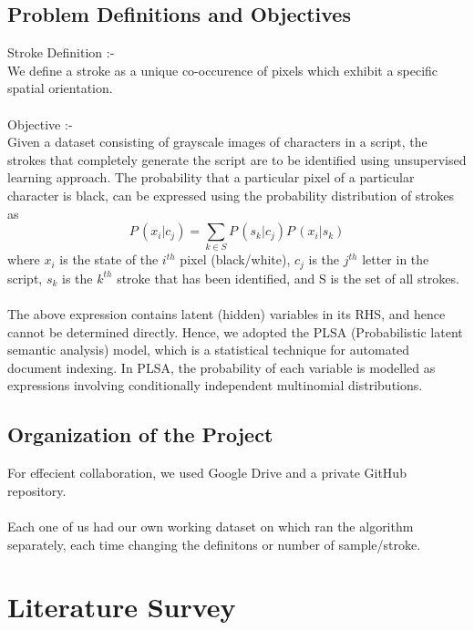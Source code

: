 \documentclass[10pt]{article}
\begin{document}
		\subsection{Problem Definitions and Objectives}
			Stroke Definition :-\\We define a stroke as a unique co-occurence of pixels which exhibit a specific spatial orientation.\\\\ 
			Objective :-\\Given a dataset consisting of grayscale images of characters in a script, the strokes that completely generate the script are to be identified using unsupervised learning approach.
			The probability that a particular pixel of a particular character is black, can be expressed using the probability distribution of strokes as\\
			\begin{equation}
			P\,(x_i|c_j)=\sum_{k\in S} P\,(s_k|c_j)P\,(x_i|s_k)
			\end{equation}
			where $x_{i}$ is the state of the $i^{th}$ pixel (black/white), $c_{j}$ is the $j^{th}$ letter in the script, $s_{k}$ is the $k^{th}$ stroke that has been identified, and S is the set of all strokes.\\\\
			The above expression contains latent (hidden) variables in its RHS, and hence cannot be determined directly. Hence, we adopted the PLSA (Probabilistic latent semantic analysis) model, which is a statistical technique for automated document indexing. In PLSA, the probability of each variable is modelled as expressions involving conditionally independent multinomial distributions.
		\subsection{Organization of the Project}  
		    For effecient collaboration, we used Google Drive and a private GitHub repository.\\\\
		    Each one of us had our own working dataset on which ran the algorithm separately, each time changing the definitons or number of sample/stroke. 
	\newpage
	\section{Literature Survey}
	\hrulefill
\end{document}
